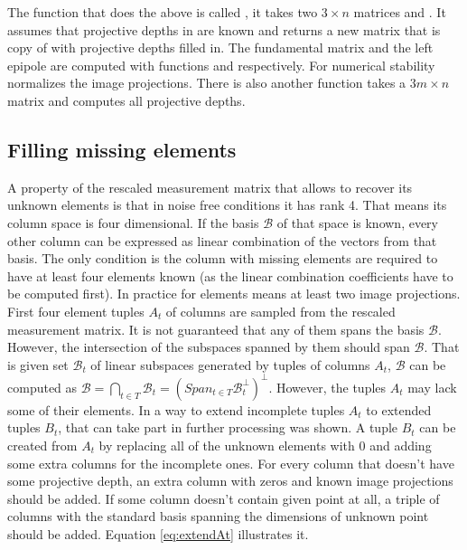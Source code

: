 \documentclass[12pt]{article}
\begin{document}
The function that does the above is called , it
takes two $3 \times n$ matrices  and . It assumes that
projective depths in  are known and returns a new matrix that is copy of
 with projective depths filled in. The fundamental matrix and the left
epipole are computed with functions  and
 respectively. For numerical stability
 normalizes the image projections. There is also
another function  takes a $3m \times n$
matrix and computes all projective depths.

\subsection{Filling missing elements}

A property of the rescaled measurement matrix that allows to recover its unknown
elements is that in noise free conditions it has rank 4. That means its column
space is four dimensional. If the basis $\mathcal{B}$ of that space is known,
every other column can be expressed as linear combination of the vectors from
that basis. The only condition is the column with missing elements are required
to have at least four elements known (as the linear combination coefficients
have to be computed first). In practice for elements means at least two image
projections. First four element tuples $A_t$ of columns are sampled from the
rescaled measurement matrix. It is not guaranteed that any of them spans the
basis $\mathcal{B}$. However, the intersection of the subspaces spanned by them
should span $\mathcal{B}$. That is given set $\mathcal{B}_t$ of linear subspaces
generated by tuples of columns $A_t$, $\mathcal{B}$ can be computed as
$\mathcal{B} = \bigcap_{t \in T} \mathcal{B}_t = (Span_{t \in T}
\mathcal{B}_t^\bot)^\bot$.  However, the tuples $A_t$ may lack some of their
elements. In \cite{svoboda04} a way to extend incomplete tuples $A_t$ to
extended tuples $B_t$, that can take part in further processing was shown. A
tuple $B_t$ can be created from $A_t$ by replacing all of the unknown elements
with $0$ and adding some extra columns for the incomplete ones. For  every
column that doesn't have some projective depth, an extra column with zeros and
known  image projections should be added. If some column doesn't contain given
point at all, a triple of columns with the standard basis spanning the
dimensions of unknown point should be added. Equation \ref{eq:extendAt}
illustrates it.
\end{document}
